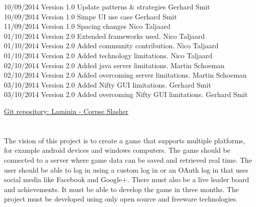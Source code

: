 \documentclass[letterpaper]{article}
\begin{document}
\begin{tabbing}
			10/09/2014	\> Version 1.0	\> Update patterns \& strategies				\> Gerhard Smit \\
			10/09/2014	\> Version 1.0	\> Simpe UI use case							\> Gerhard Smit \\
			11/09/2014	\> Version 1.0	\> Spacing changes								\> Nico Taljaard \\
			01/10/2014	\> Version 2.0	\> Extended frameworks used.					\> Nico Taljaard \\
			01/10/2014	\> Version 2.0	\> Added community contribution.				\> Nico Taljaard \\
			01/10/2014	\> Version 2.0	\> Added technology limitations.				\> Nico Taljaard \\
			02/10/2014	\> Version 2.0	\> Added java server limitations.				\> Martin Schoeman\\
			02/10/2014	\> Version 2.0	\> Added overcoming server limitations.			\> Martin Schoeman\\
			03/10/2014	\> Version 2.0	\> Added Nifty GUI limitations.				\> Gerhard Smit\\
			03/10/2014	\> Version 2.0	\> Added overcoming Nifty GUI limitations.			\> Gerhard Smit\\
		\end{tabbing}
		
	\newpage
		\renewcommand\contentsname{TABLE OF CONTENTS}
		\newcommand\contentsnameLC{\colorbox{blue}{\makebox[\textwidth-2\fboxsep][l]{\bfseries\color{white} Table of Contents}}}
		
		\renewcommand{\cftdot}{}
		\hypersetup{linktocpage}
		\tableofcontents
		
		\begin{flushleft}
			\LARGE\href{https://github.com/njTaljaard/Laminin_CorpseSlasher/}{Git repository: Laminin - Corpse Slasher}
		\end{flushleft}
		
	\newpage
	
		\section*{\colorbox{blue}{}} 
		\vspace{0.2in}
		
		The vision of this project is to create a game that supports multiple platforms, for example android devices and windows computers. The game should be connected to a server where game data can be saved and retrieved real time. The user should be able to log in using a custom log in or an OAuth log in that uses social media like Facebook and Google+. There must also be a live leader board and achievements. It must be able to develop the game in three months. The project must be developed using only open source and freeware technologies.
					
\end{document}
